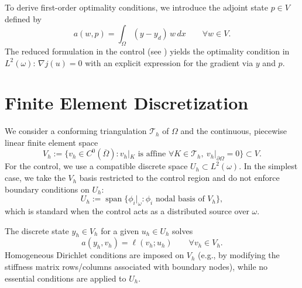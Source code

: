 \documentclass[11pt,a4paper]{article}
\newcommand{\Om}{\Omega}
\newcommand{\om}{\omega}
\begin{document}
To derive first-order optimality conditions, we introduce the adjoint state $p\in V$ defined by
\begin{equation}
  a(w,p) = \int_{\Om} (y - y_d)\, w\,dx \qquad \forall w\in V.
\end{equation}
The reduced formulation in the control (see ) yields the optimality condition in $L^2(\om)$: $\nabla j(u)=0$ with an explicit expression for the gradient via $y$ and $p$.

\section{Finite Element Discretization}
We consider a conforming triangulation $\mathcal{T}_h$ of $\Om$ and the continuous, piecewise linear finite element space
\begin{equation}
  V_h := \{ v_h\in C^0(\overline{\Om}) : v_h|_K \text{ is affine } \forall K\in \mathcal{T}_h,\ v_h|_{\partial\Om}=0 \} \subset V.
\end{equation}
For the control, we use a compatible discrete space $U_h\subset L^2(\om)$. In the simplest case, we take the $V_h$ basis restricted to the control region and do not enforce boundary conditions on $U_h$:
\begin{equation}
  U_h := \operatorname{span}\{ \phi_i|_{\om} : \phi_i \text{ nodal basis of } V_h\},
\end{equation}
which is standard when the control acts as a distributed source over $\om$.

The discrete state $y_h\in V_h$ for a given $u_h\in U_h$ solves
\begin{equation}
  a(y_h, v_h) = \ell(v_h; u_h) \qquad \forall v_h\in V_h.
\end{equation}
Homogeneous Dirichlet conditions are imposed on $V_h$ (e.g., by modifying the stiffness matrix rows/columns associated with boundary nodes), while no essential conditions are applied to $U_h$.
\end{document}
